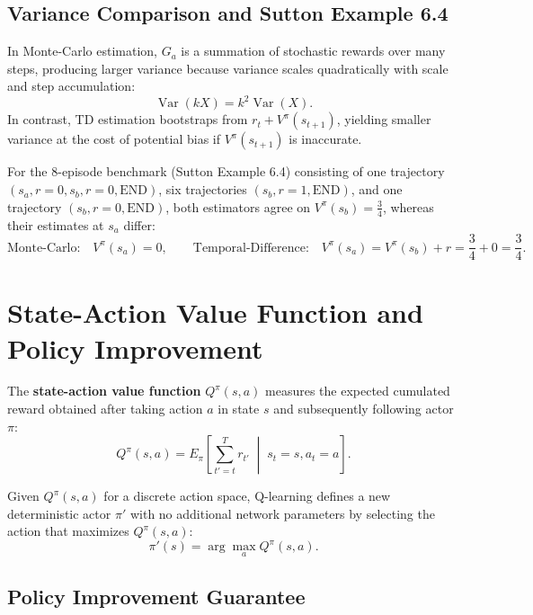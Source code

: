 \documentclass[11pt, a4paper]{article}
\begin{document}
\subsection*{Variance Comparison and Sutton Example 6.4}

In Monte-Carlo estimation, $G_a$ is a summation of stochastic rewards over many steps, producing larger variance because variance scales quadratically with scale and step accumulation:
\begin{equation}\label{eq:q-variance-scaling}
    \operatorname{Var}(kX) = k^2 \operatorname{Var}(X).
\end{equation}
In contrast, TD estimation bootstraps from $r_t + V^\pi(s_{t+1})$, yielding smaller variance at the cost of potential bias if $V^\pi(s_{t+1})$ is inaccurate.

For the 8-episode benchmark (Sutton Example 6.4) consisting of one trajectory $(s_a, r=0, s_b, r=0, \text{END})$, six trajectories $(s_b, r=1, \text{END})$, and one trajectory $(s_b, r=0, \text{END})$, both estimators agree on $V^\pi(s_b) = \frac{3}{4}$, whereas their estimates at $s_a$ differ:
\begin{equation}\label{eq:q-mc-td-example}
    \text{Monte-Carlo:} \quad V^\pi(s_a) = 0, \qquad
    \text{Temporal-Difference:} \quad V^\pi(s_a) = V^\pi(s_b) + r = \frac{3}{4} + 0 = \frac{3}{4}.
\end{equation}

\section{State-Action Value Function and Policy Improvement}

The \textbf{state-action value function} $Q^\pi(s, a)$ measures the expected cumulated reward obtained after taking action $a$ in state $s$ and subsequently following actor $\pi$:
\begin{equation}\label{eq:q-action-value}
    Q^\pi(s, a) = E_\pi\left[\sum_{t'=t}^{T} r_{t'} \;\middle|\; s_t = s, a_t = a\right].
\end{equation}

Given $Q^\pi(s, a)$ for a discrete action space, Q-learning defines a new deterministic actor $\pi'$ with no additional network parameters by selecting the action that maximizes $Q^\pi(s, a)$:
\begin{equation}\label{eq:q-greedy-policy}
    \pi'(s) = \arg\max_a Q^\pi(s, a).
\end{equation}

\subsection*{Policy Improvement Guarantee}
\end{document}
